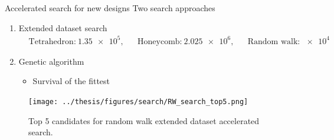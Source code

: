 \documentclass[
	10pt, %
]{beamer}
\begin{document}
\begin{frame}{Accelerated search for new designs}
	Two search approaches
	\begin{enumerate}
		\item Extended dataset search
		\begin{align*}
			&\text{Tetrahedron:} \ \num{1.35e5},& &\text{Honeycomb:} \ \num{2.025e6},& &\text{Random walk:} \ \num{e4}&
		\end{align*}
		\item Genetic algorithm
		\begin{itemize}
			\item Survival of the fittest 
		\end{itemize}
	\end{enumerate}

	\begin{figure}[H]
		\centering
		\texttt{[image: ../thesis/figures/search/RW\_search\_top5.png]}
		\caption{Top 5 candidates for random walk extended dataset accelerated search. }
	\end{figure}  
\end{frame}
%
%






\end{document}
